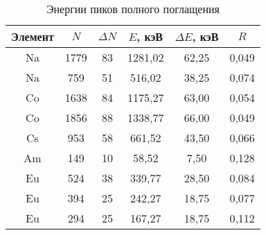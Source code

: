 \begin{table}[h!]
    \centering
    \begin{tabular}{|c|c|c|c|c|c|}
    \hline
    Элемент & $N$   & $\Delta N$ & $E$, кэВ  & $\Delta E$, кэВ & $R$    \\ \hline
    Na      & 1779  & 83         & 1281,02  & 62,25          & 0,049  \\ \hline
    Na      & 759   & 51         & 516,02   & 38,25          & 0,074  \\ \hline
    Co      & 1638  & 84         & 1175,27  & 63,00          & 0,054  \\ \hline
    Co      & 1856  & 88         & 1338,77  & 66,00          & 0,049  \\ \hline
    Cs      & 953   & 58         & 661,52   & 43,50          & 0,066  \\ \hline
    Am      & 149   & 10         & 58,52    & 7,50           & 0,128  \\ \hline
    Eu      & 524   & 38         & 339,77   & 28,50          & 0,084  \\ \hline
    Eu      & 394   & 25         & 242,27   & 18,75          & 0,077  \\ \hline
    Eu      & 294   & 25         & 167,27   & 18,75          & 0,112  \\ \hline
    \end{tabular}
    \caption{Энергии пиков полного поглащения}
    \label{tab:main_tab}
\end{table}